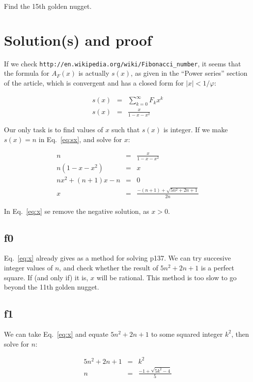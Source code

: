 \documentclass[english]{article}
\begin{document}
Find the 15th golden nugget.

\section{Solution(s) and proof}

If we check {\tt http://en.wikipedia.org/wiki/Fibonacci\_number}, it seems that the formula for $A_F(x)$ is actually $s(x)$, as given in the ``Power series'' section of the article, which is convergent and has a closed form for $|x| < 1/\varphi$:

\begin{eqnarray}
s(x) & = & \sum_{k=0}^{\infty} F_k x^k \\
s(x) & = & \frac{x}{1-x-x^2} \label{eq:sx}
\end{eqnarray}

Our only task is to find values of $x$ such that $s(x)$ is integer. If we make $s(x) = n$ in Eq.~\ref{eq:sx}, and solve for $x$:

\begin{eqnarray}
n & = & \frac{x}{1-x-x^2} \\
n (1-x-x^2) & = & x \\
n x^2 + (n+1) x - n & = & 0 \\
x & = & \frac{-(n+1)+\sqrt{5n^2+2n+1}}{2n} \label{eq:x}
\end{eqnarray}

In Eq.~\ref{eq:x} se remove the negative solution, as $x > 0$.

\subsection{f0}

Eq.~\ref{eq:x} already gives as a method for solving p137. We can try succesive integer values of $n$, and check whether the result of $5n^2+2n+1$ is a perfect square. If (and only if) it is, $x$ will be rational. This method is too slow to go beyond the 11th golden nugget.

\subsection{f1}

We can take Eq.~\ref{eq:x} and equate $5n^2+2n+1$ to some squared integer $k^2$, then solve for $n$:

\begin{eqnarray}
5n^2+2n+1 & = & k^2 \\
n & = & \frac{-1+\sqrt{5k^2-4}}{5} \label{eq:n}
\end{eqnarray}
\end{document}
